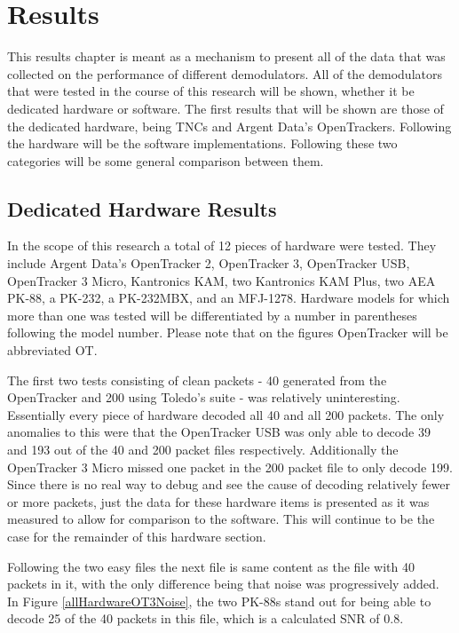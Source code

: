 \chapter{Results}
This results chapter is meant as a mechanism to present all of the data that was collected on the performance of different demodulators. All of the demodulators that were tested in the course of this research will be shown, whether it be dedicated hardware or software. The first results that will be shown are those of the dedicated hardware, being TNCs and Argent Data's OpenTrackers. Following the hardware will be the software implementations. Following these two categories will be some general comparison between them.

\section{Dedicated Hardware Results}
In the scope of this research a total of 12 pieces of hardware were tested. They include Argent Data's OpenTracker 2, OpenTracker 3, OpenTracker USB, OpenTracker 3 Micro, Kantronics KAM, two Kantronics KAM Plus, two AEA PK-88, a PK-232, a PK-232MBX, and an MFJ-1278. Hardware models for which more than one was tested will be differentiated by a number in parentheses following the model number. Please note that on the figures OpenTracker will be abbreviated OT.

The first two tests consisting of clean packets - 40 generated from the OpenTracker and 200 using Toledo's suite - was relatively uninteresting. Essentially every piece of hardware decoded all 40 and all 200 packets. The only anomalies to this were that the OpenTracker USB was only able to decode 39 and 193 out of the 40 and 200 packet files respectively. Additionally the OpenTracker 3 Micro missed one packet in the 200 packet file to only decode 199. Since there is no real way to debug and see the cause of decoding relatively fewer or more packets, just the data for these hardware items is presented as it was measured to allow for comparison to the software. This will continue to be the case for the remainder of this hardware section.

Following the two easy files the next file is same content as the file with 40 packets in it, with the only difference being that noise was progressively added. In Figure \ref{allHardwareOT3Noise}, the two PK-88s stand out for being able to decode 25 of the 40 packets in this file, which is a calculated SNR of 0.8.

